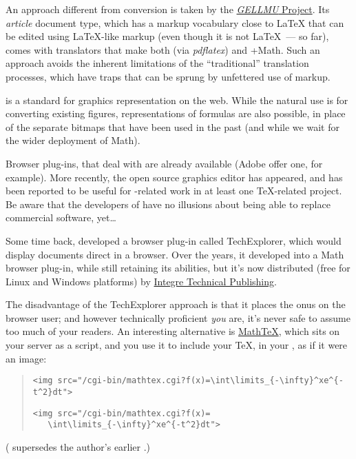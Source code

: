\begin{description}
  An approach different from \AllTeX{} conversion is taken by
  the \href{http://www.albany.edu/~hammond/gellmu/}{\emph{GELLMU} Project}.
  Its \emph{article}  document type, which has a markup vocabulary
  close to \LaTeX{} that can be edited using \LaTeX{}-like markup
  (even though it is not \LaTeX{}~--- so far), comes with translators
  that make both  (via \emph{pdflatex}) and
  +Math.  Such an approach avoids the inherent
  limitations of the ``traditional'' \AllTeX{} translation processes,
  which have traps that can be sprung by unfettered use of \AllTeX{}
  markup.
\item[Graphics] 
   is a standard for graphics representation on the web.
  While the natural use is for converting existing figures,
  representations of formulas are also possible, in place of the separate
  bitmaps that have been used in the past (and while we wait for the
  wider deployment of Math).
  
  Browser plug-ins, that deal with  are already available
  (Adobe offer one, for example).  More recently, the open source
  graphics editor \href{http://www.inkscape.org/}{}
  has appeared, and has been reported to be useful for
  -related work in at least one \TeX{}-related project.  Be
  aware that the developers of  have no illusions
  about being able to replace commercial software, yet\dots{}
\item[Direct use of \TeX{} markup]
  Some time back,  developed a browser plug-in called
  TechExplorer, which would display \AllTeX{} documents direct in a
  browser.  Over the years, it developed into a Math browser
  plug-in, while still retaining its \AllTeX{} abilities, but it's now
  distributed (free for Linux and Windows platforms) by
  \href{http://www.integretechpub.com/}{Integre Technical Publishing}.

  The disadvantage of the TechExplorer approach is that it places the
  onus on the browser user; and however technically proficient
  \emph{you} are, it's never safe to assume too much of your readers.
  An interesting alternative is
  \href{http://www.forkosh.com/mathtex.html}{Math\TeX{}}, which sits
  on your server as a  script, and you use it to include
  your \TeX{}, in your , as if it were an image:
\begin{quote}
\begin{wideversion}
\begin{verbatim}
<img src="/cgi-bin/mathtex.cgi?f(x)=\int\limits_{-\infty}^xe^{-t^2}dt">
\end{verbatim}
\end{wideversion}
\begin{narrowversion}
\begin{verbatim}
<img src="/cgi-bin/mathtex.cgi?f(x)=
   \int\limits_{-\infty}^xe^{-t^2}dt">
\end{verbatim}
\end{narrowversion}
\end{quote}
( supersedes the author's earlier .)
\end{description}
